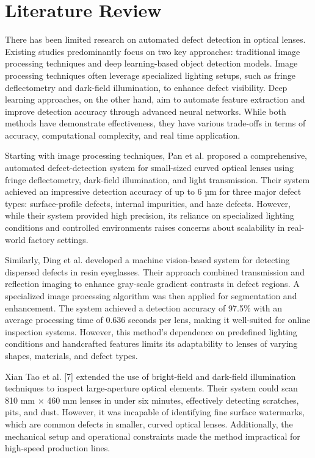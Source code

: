 \section{Literature Review}
There has been limited research on automated defect detection in optical lenses. Existing studies predominantly focus on two key approaches: traditional image processing techniques and deep learning-based object detection models. Image processing techniques often leverage specialized lighting setups, such as fringe deflectometry and dark-field illumination, to enhance defect visibility. Deep learning approaches, on the other hand, aim to automate feature extraction and improve detection accuracy through advanced neural networks. While both methods have demonstrate effectiveness, they have various trade-offs in terms of accuracy, computational complexity, and real time application.

Starting with image processing techniques, Pan et al. \cite{pan2019comprehensive} proposed a comprehensive, automated defect-detection system for small-sized curved optical lenses using fringe deflectometry, dark-field illumination, and light transmission. Their system achieved an impressive detection accuracy of up to 6 µm for three major defect types: surface-profile defects, internal impurities, and haze defects. However, while their system provided high precision, its reliance on specialized lighting conditions and controlled environments raises concerns about scalability in real-world factory settings.

Similarly, Ding et al. \cite{ding2020automatic} developed a machine vision-based system for detecting dispersed defects in resin eyeglasses. Their approach combined transmission and reflection imaging to enhance gray-scale gradient contrasts in defect regions. A specialized image processing algorithm was then applied for segmentation and enhancement. The system achieved a detection accuracy of 97.5\% with an average processing time of 0.636 seconds per lens, making it well-suited for online inspection systems. However, this method's dependence on predefined lighting conditions and handcrafted features limits its adaptability to lenses of varying shapes, materials, and defect types.

Xian Tao et al. [7] \cite{tao2015novel} extended the use of bright-field and dark-field illumination techniques to inspect large-aperture optical elements. Their system could scan 810 mm × 460 mm lenses in under six minutes, effectively detecting scratches, pits, and dust. However, it was incapable of identifying fine surface watermarks, which are common defects in smaller, curved optical lenses. Additionally, the mechanical setup and operational constraints made the method impractical for high-speed production lines.

